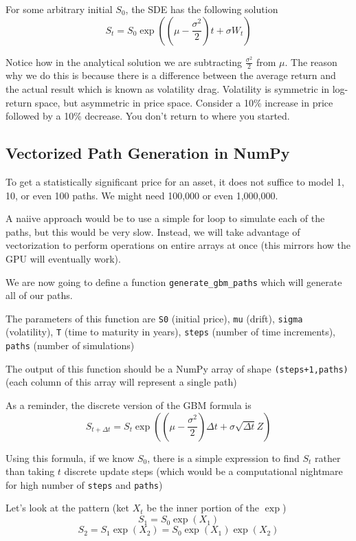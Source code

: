 \documentclass{article}
\begin{document}
For some arbitrary initial \(S_0\), the SDE has the following solution
\[S_t=S_0\exp\left(\left(\mu-\frac{\sigma^2}{2}\right)t+\sigma W_t\right)\]

Notice how in the analytical solution we are subtracting \(\frac{\sigma^2}{2}\) from \(\mu\).
The reason why we do this is because there is a difference between the average return and the actual result which is known as volatility drag.
Volatility is symmetric in log-return space, but asymmetric in price space. 
Consider a 10\% increase in price followed by a 10\% decrease. You don't return to where you started. 

\subsection*{Vectorized Path Generation in NumPy}
To get a statistically significant price for an asset, it does not suffice to model 1, 10, or even 100 paths.
We might need 100,000 or even 1,000,000. 

A naiive approach would be to use a simple for loop to simulate each of the paths, but this would be very slow.
Instead, we will take advantage of vectorization to perform operations on entire arrays at once (this mirrors how the GPU will eventually work).

We are now going to define a function \texttt{generate\_gbm\_paths} which will generate all of our paths.

The parameters of this function are \texttt{S0} (initial price), \texttt{mu} (drift), \texttt{sigma} (volatility), \texttt{T} (time to maturity in years), \texttt{steps} (number of time increments), \texttt{paths} (number of simulations)

The output of this function should be a NumPy array of shape \texttt{(steps+1,paths)} (each column of this array will represent a single path)

As a reminder, the discrete version of the GBM formula is \[S_{t+\Delta t}=S_t\exp\left(\left(\mu-\frac{\sigma^2}{2}\right)\Delta t+\sigma\sqrt{\Delta t}Z\right)\]

Using this formula, if we know \(S_0\), there is a simple expression to find \(S_t\) rather than taking \(t\) discrete update steps (which would be a computational nightmare for high number of \texttt{steps} and \texttt{paths})

Let's look at the pattern (ket \(X_t\) be the inner portion of the \(\exp\))
\[S_1=S_0\exp(X_1)\]
\[S_2=S_1\exp(X_2)=S_0\exp(X_1)\exp(X_2)\]
\end{document}
